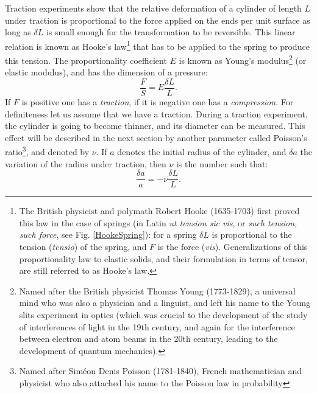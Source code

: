 \documentclass[DIV=12]{article}
\begin{document}
 Traction experiments show that the relative 
 deformation of a cylinder of length $L$ under traction is proportional 
 to the force applied on the ends per unit surface
 as long as $\delta L$ is small enough for the transformation to be reversible.
 This linear relation is known as Hooke's law\footnote{The British physicist and polymath Robert Hooke (1635-1703) first proved this law 
 in the case of springs (in Latin {\emph{ut tension sic vis}}, or {\emph{such tension, such force}}, see Fig. \ref{HookeSpring}): for a spring $\delta L$ is proportional to the tension ({\emph{tensio}}) of the spring, and $F$ is the force ({\emph{vis}}). Generalizations of this proportionality 
 law to elastic solids, and their formulation in terms of tensor, are still referred to as Hooke's law.}
  that has to be applied to the spring to produce this tension. The proportionality 
 coefficient $E$ is known as Young's modulus\footnote{Named after the British physicist Thomas Young (1773-1829), 
  a universal mind who was also a physician and a linguist, and left his 
 name to the Young slits experiment in optics (which was crucial to the development of the study of interferences of light in the 19th century, and again for the interference between electron and atom beams in the 20th century, leading to the development of quantum mechanics).} (or elastic modulus), and has the dimension
 of a pressure:
 \begin{equation}
   \frac{F}{S} = E \frac{\delta L}{L}. 
\label{Young}
\end{equation}
 If $F$ is positive one has a {\emph{traction}}, if it is negative one has a {\emph{compression}}.
 For definiteness let us assume that we have a traction. During a traction experiment, the cylinder
 is going to become thinner, and its diameter can be measured. This effect will be described in the 
 next section by another parameter called Poisson's ratio\footnote{Named after Sim\'eon Denis Poisson (1781-1840), French mathematician and physicist
who also attached his name to the Poisson law in probability}, and denoted by $\nu$. If $a$ denotes the initial radius of the cylinder, and $\delta a$  the variation of the radius under traction, then $\nu$ is the number such that:
\begin{equation}
\frac{\delta a}{a} = -\nu \frac{\delta L}{L}.
\label{PoissonDef}
\end{equation}
\end{document}

